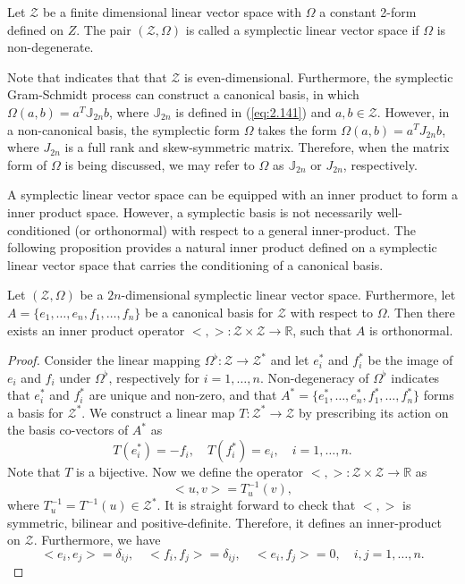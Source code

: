 \begin{definition}
Let $\mathcal Z$ be a finite dimensional linear vector space with $\Omega$ a constant 2-form defined on $Z$. The pair $(\mathcal Z,\Omega)$ is called a symplectic linear vector space if $\Omega$ is non-degenerate.
\end{definition}
Note that  indicates that that $\mathcal Z$ is even-dimensional. Furthermore, the symplectic Gram-Schmidt process can construct a canonical basis, in which $\Omega(a,b) = a^T \mathbb J_{2n} b$, where $\mathbb J_{2n}$ is defined in (\ref{eq:2.141}) and $a,b\in \mathcal Z$. However, in a non-canonical basis, the symplectic form $\Omega$ takes the form $\Omega(a,b) = a^TJ_{2n}b$, where $J_{2n}$ is a full rank and skew-symmetric matrix. Therefore, when the matrix form of $\Omega$ is being discussed, we may refer to $\Omega$ as $\mathbb J_{2n}$ or $J_{2n}$, respectively.

A symplectic linear vector space can be equipped with an inner product to form a inner product space. However, a symplectic basis is not necessarily well-conditioned (or orthonormal) with respect to a general inner-product. The following proposition provides a natural inner product defined on a symplectic linear vector space that carries the conditioning of a canonical basis.

\begin{proposition} \label{theorem:2.11}
Let $(\mathcal Z,\Omega)$ be a $2n$-dimensional symplectic linear vector space. Furthermore, let $A = \{ e_1,\dots,e_n,f_1,\dots,f_n \}$ be a canonical basis for $\mathcal Z$ with respect to $\Omega$. Then there exists an inner product operator $<,>:\mathcal Z\times \mathcal Z \to \mathbb R$, such that $A$ is orthonormal.
\end{proposition}

\begin{proof}
Consider the linear mapping $\Omega^{\flat}:\mathcal Z \to \mathcal Z^*$ and let $e_i^*$ and $f_i^*$ be the image of $e_i$ and $f_i$ under $\Omega^{\flat}$, respectively for $i=1,\dots,n$. Non-degeneracy of $\Omega^{\flat}$ indicates that $e_i^*$ and $f_i^*$ are unique and non-zero, and that $A^*=\{e_1^*,\dots,e_n^*,f_1^*,\dots,f_n^*\}$ forms a basis for $\mathcal Z^*$. We construct a linear map $T:\mathcal Z^* \to \mathcal Z$ by prescribing its action on the basis co-vectors of $A^*$ as
\begin{equation*}
	T(e_i^*) = -f_i, \quad T(f_i^*) = e_i, \quad i=1,\dots,n.
\end{equation*}
Note that $T$ is a bijective. Now we define the operator $<,>:\mathcal Z\times \mathcal Z \to \mathbb R$ as
\begin{equation*}
	<u,v> = T^{-1}_{u} (v),	
\end{equation*}
where $T^{-1}_{u} = T^{-1}(u) \in \mathcal Z^*$. It is straight forward to check that $<,>$ is symmetric, bilinear and positive-definite. Therefore, it defines an inner-product on $\mathcal Z$. Furthermore, we have
\begin{equation*}
	<e_i,e_j> = \delta_{ij},\quad <f_i,f_j> = \delta_{ij}, \quad <e_i,f_j> = 0, \quad i,j=1,\dots,n.
\end{equation*}
\end{proof}

